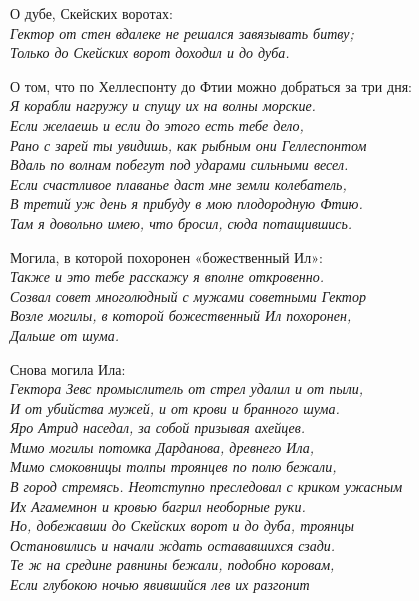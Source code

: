 О дубе, Скейских воротах:\\

\noindent
\textit{Гектор от стен вдалеке не решался завязывать битву;\\
Только до Скейских ворот доходил и до дуба.\\}

О том, что по Хеллеспонту до Фтии можно добраться за три дня:\\

\noindent
\textit{Я корабли нагружу и спущу их на волны морские.\\
Если желаешь и если до этого есть тебе дело,\\
Рано с зарей ты увидишь, как рыбным они Геллеспонтом\\
Вдаль по волнам побегут под ударами сильными весел.\\
Если счастливое плаванье даст мне земли колебатель,\\
В третий уж день я прибуду в мою плодородную Фтию.\\
Там я довольно имею, что бросил, сюда потащившись.\\}

Могила, в которой похоронен «божественный Ил»:\\

\noindent
\textit{Также и это тебе расскажу я вполне откровенно.\\
Созвал совет многолюдный с мужами советными Гектор\\
Возле могилы, в которой божественный Ил похоронен,\\
Дальше от шума.\\}

Снова могила Ила:\\

\noindent
\textit{Гектора Зевс промыслитель от стрел удалил и от пыли,\\
И от убийства мужей, и от крови и бранного шума.\\
Яро Атрид наседал, за собой призывая ахейцев.\\
Мимо могилы потомка Дарданова, древнего Ила,\\
Мимо смоковницы толпы троянцев по полю бежали,\\
В город стремясь. Неотступно преследовал с криком ужасным\\
Их Агамемнон и кровью багрил необорные руки.\\
Но, добежавши до Скейских ворот и до дуба, троянцы\\
Остановились и начали ждать остававшихся сзади.\\
Те ж на средине равнины бежали, подобно коровам,\\
Если глубокою ночью явившийся лев их разгонит\\}

